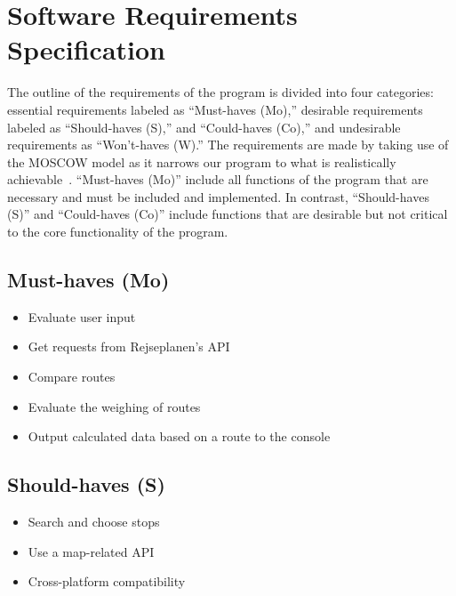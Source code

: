 \section{Software Requirements Specification}\label{sec:software-requirements-specification}

The outline of the requirements of the program is divided into four categories: essential requirements labeled as
``Must-haves (Mo),'' desirable requirements labeled as ``Should-haves (S),'' and ``Could-haves (Co),'' and
undesirable requirements as ``Won't-haves (W).''
The requirements are made by taking use of the MOSCOW model as it narrows our program to what is realistically
achievable~\cite{hudaib2018requirements}.
``Must-haves (Mo)'' include all functions of the program that are necessary and must be included and implemented. In
contrast, ``Should-haves (S)'' and ``Could-haves (Co)'' include functions that are desirable but not critical to
the core functionality of the program.

\subsection{Must-haves (Mo)}\label{subsec:must-haves}

\begin{itemize}
    \item Evaluate user input
    \item Get requests from Rejseplanen’s API
    \item Compare routes
    \item Evaluate the weighing of routes
    \item Output calculated data based on a route to the console
\end{itemize}

\subsection{Should-haves (S)}\label{subsec:should-haves}

\begin{itemize}
    \item Search and choose stops
    \item Use a map-related API
    \item Cross-platform compatibility
\end{itemize}

